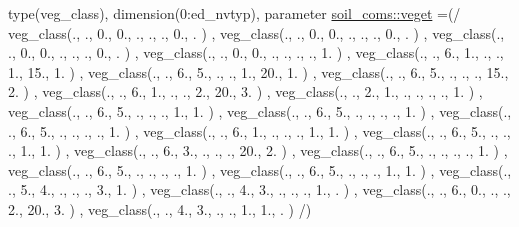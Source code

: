 \begin{DoxyCompactItemize}
type(veg\+\_\+class), dimension(0\+:ed\+\_\+nvtyp), parameter \hyperlink{namespacesoil__coms_abc30de75cb7efc15f13116fb03fff8bc}{soil\+\_\+coms\+::veget} =(/ veg\+\_\+class(., ., 0., 0., ., ., ., 0., . ) , veg\+\_\+class(., ., 0., 0., ., ., ., 0., . ) , veg\+\_\+class(., ., 0., 0., ., ., ., 0., . ) , veg\+\_\+class(., ., 0., 0., ., ., ., ., 1. ) , veg\+\_\+class(., ., 6., 1., ., ., 1., 15., 1. ) , veg\+\_\+class(., ., 6., 5., ., ., 1., 20., 1. ) , veg\+\_\+class(., ., 6., 5., ., ., ., 15., 2. ) , veg\+\_\+class(., ., 6., 1., ., ., 2., 20., 3. ) , veg\+\_\+class(., ., 2., 1., ., ., ., ., 1. ) , veg\+\_\+class(., ., 6., 5., ., ., ., 1., 1. ) , veg\+\_\+class(., ., 6., 5., ., ., ., ., 1. ) , veg\+\_\+class(., ., 6., 5., ., ., ., ., 1. ) , veg\+\_\+class(., ., 6., 1., ., ., ., 1., 1. ) , veg\+\_\+class(., ., 6., 5., ., ., ., 1., 1. ) , veg\+\_\+class(., ., 6., 3., ., ., ., 20., 2. ) , veg\+\_\+class(., ., 6., 5., ., ., ., ., 1. ) , veg\+\_\+class(., ., 6., 5., ., ., ., ., 1. ) , veg\+\_\+class(., ., 6., 5., ., ., ., 1., 1. ) , veg\+\_\+class(., ., 5., 4., ., ., ., 3., 1. ) , veg\+\_\+class(., ., 4., 3., ., ., ., 1., . ) , veg\+\_\+class(., ., 6., 0., ., ., 2., 20., 3. ) , veg\+\_\+class(., ., 4., 3., ., ., 1., 1., . ) /)
\end{DoxyCompactItemize}
